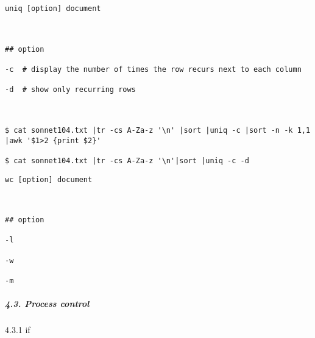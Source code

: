 \documentclass[
]{article}
\begin{document}
\begin{verbatim}
uniq [option] document



## option

-c  # display the number of times the row recurs next to each column

-d  # show only recurring rows



$ cat sonnet104.txt |tr -cs A-Za-z '\n' |sort |uniq -c |sort -n -k 1,1 |awk '$1>2 {print $2}'

$ cat sonnet104.txt |tr -cs A-Za-z '\n'|sort |uniq -c -d
\end{verbatim}

\begin{verbatim}
wc [option] document



## option

-l

-w

-m
\end{verbatim}

\hypertarget{header-n365}{%
\subparagraph{4.3. Process control}\label{header-n365}}

4.3.1 if
\end{document}
